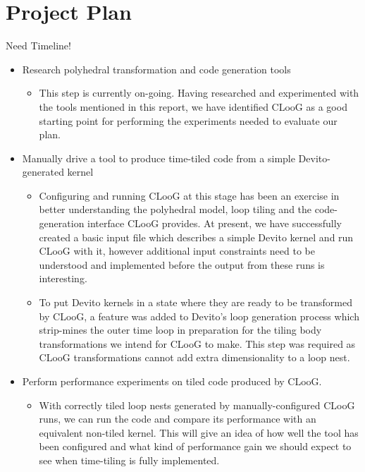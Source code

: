\documentclass[a4paper,12pt,twoside]{report}
\begin{document}
\chapter{Project Plan}
Need Timeline!
\begin{itemize}
    \item Research polyhedral transformation and code generation tools
        \begin{itemize}
            \item This step is currently on-going. Having researched and experimented with the tools mentioned in
                this report, we have identified CLooG as a good starting point for performing the experiments needed
                to evaluate our plan.
        \end{itemize}
    \item Manually drive a tool to produce time-tiled code from a simple Devito-generated kernel
        \begin{itemize}
            \item Configuring and running CLooG at this stage has been an exercise in better understanding the polyhedral model,
                loop tiling and the code-generation interface CLooG provides. At present, we have successfully created a basic input file
                which describes a simple Devito kernel and run CLooG with it, however additional input constraints need to be understood and implemented
                before the output from these runs is interesting.
            \item To put Devito kernels in a state where they are ready to be transformed by CLooG, a feature was added to Devito's loop generation process
                which strip-mines the outer time loop in preparation for the tiling body transformations we intend for CLooG to make. This step was required as CLooG
                transformations cannot add extra dimensionality to a loop nest.
        \end{itemize}
    \item Perform performance experiments on tiled code produced by CLooG.
        \begin{itemize}
            \item With correctly tiled loop nests generated by manually-configured CLooG runs, we can run the code and compare its performance with an equivalent 
                non-tiled kernel. This will give an idea of how well the tool has been configured and what kind of performance gain we should expect to see when
                time-tiling is fully implemented.

\end{itemize}
\end{itemize}
\end{document}

